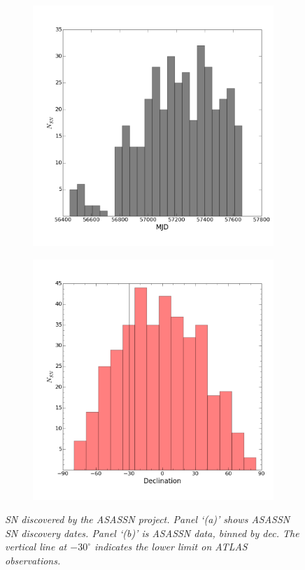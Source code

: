 \documentclass[aps,prb,twocolumn,superscriptaddress]{revtex4-1}
\begin{document}
\begin{figure}
	\centering
	\begin{subfigure}{.5\textwidth}
	  \centering
	  \includegraphics[width=1\linewidth]{figures/mjd_histo_step50.png}
		\caption{\it \small{ }}
		\label{fig:mjdhist}
	\end{subfigure}%
	\begin{subfigure}{.5\textwidth}
	  \centering
			\includegraphics[width=1\linewidth]{figures/dec_histo_step10.png}
		\caption{\it \small{ }}
		\label{fig:dechist}
	\end{subfigure}
	\caption{\it \small{SN discovered by the ASASSN project.  Panel `(a)' shows ASASSN SN discovery dates.  Panel `(b)' is ASASSN data, binned by dec. The vertical line at $-30^{\circ}$ indicates the lower limit on ATLAS observations.}}
	\label{fig:asnhist}
\end{figure}
\end{document}
